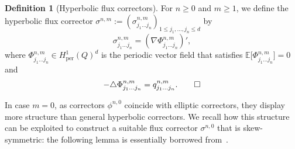 \documentclass[JEP,XML,SOM,Unicode,published]{cedram}
\theoremstyle{plain}
\theoremstyle{definition}
\newtheorem{defin0}[theor0]{Definition}
\newenvironment{defin}
{\renewcommand{\qedsymbol}{$\lozenge$}\pushQED{\qed}\begin{defin0}}
{\popQED\end{defin0}}
\numberwithin{equation}{section}
\newcommand{\per}{{\operatorname{per}}}
\newcommand{\expecm}[1]{\mathbb{E}\bigl[ #1 \bigr]}\let\bexpec\expecm
\begin{document}
\begin{defin}[Hyperbolic flux correctors]\label{def:cocor}
For $n\ge 0$ and $m\ge1$, we define the hyperbolic flux corrector $\sigma^{n,m}:=(\sigma^{n,m}_{j_1\ldots j_n})_{1\le j_1,\ldots,j_n\le d}$ by
\[\sigma^{n,m}_{j_1\ldots j_n}=(\nabla\Phi^{n,m}_{j_1\ldots j_n})',\]
where $\Phi^{n,m}_{j_1\ldots j_n}\in H^1_\per(Q)^d$ is the periodic vector field that satisfies
\mbox{$\expecm{\Phi_{j_1\ldots j_{n}}^{n,m}}=0$} and
\[-\triangle\Phi^{n,m}_{j_1\ldots j_{n}}=q^{n,m}_{j_1\ldots j_n}.\qedhere\]
\end{defin}

In case $m=0$, as correctors $\phi^{n,0}$ coincide with elliptic correctors, they display more structure than general hyperbolic correctors. We recall how this structure can be exploited to construct a suitable flux corrector $\sigma^{n,0}$ that is skew-symmetric: the following lemma is essentially borrowed from~\cite{DO1}.
\end{document}
